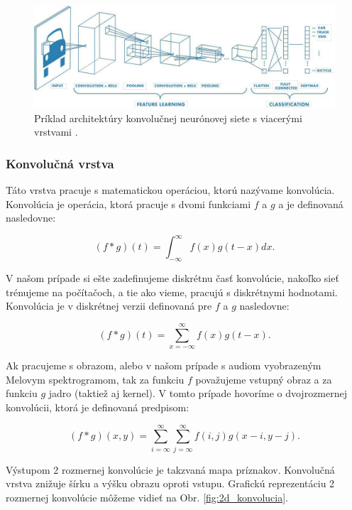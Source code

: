 \begin{figure}[H]
\centerline{\includegraphics[width=1\textwidth]{images/conv multi layer.jpg}}
\caption{Príklad architektúry konvolučnej neurónovej siete s viacerými vrstvami \cite{convnn}.}
\label{fig:conv_multi_layer}
\end{figure}

\subsubsection{Konvolučná vrstva}

Táto vrstva pracuje s matematickou operáciou, ktorú nazývame konvolúcia. Konvolúcia je operácia, ktorá pracuje s dvomi funkciami $f$ a $g$ a je definovaná nasledovne:

\begin{equation}
(f * g)(t) = \int_{-\infty}^{\infty} f(x)g(t - x) dx.
\end{equation}

V našom prípade si ešte zadefinujeme diskrétnu časť konvolúcie, nakoľko sieť trénujeme
na počítačoch, a tie ako vieme, pracujú s diskrétnymi hodnotami. Konvolúcia je v
diskrétnej verzii definovaná pre $f$ a $g$ nasledovne:

\begin{equation}
(f * g)(t) = \sum_{x=-\infty}^{\infty} f(x)g(t - x).
\end{equation}

Ak pracujeme s obrazom, alebo v našom prípade s audiom vyobrazeným Melovym spektrogramom, tak za funkciu $f$ považujeme vstupný obraz a za funkciu $g$ jadro (taktiež aj kernel). V tomto prípade hovoríme o dvojrozmernej konvolúcii, ktorá
je definovaná predpisom:

\begin{equation}
(f * g)(x, y) = \sum_{i=\infty}^{\infty} \sum_{j=\infty}^{\infty} f(i, j)g(x - i, y - j).
\end{equation}

Výstupom 2 rozmernej konvolúcie je takzvaná mapa príznakov. Konvolučná vrstva znižuje šírku a výšku obrazu oproti vstupu. Grafickú reprezentáciu 2 rozmernej konvolúcie môžeme vidieť na Obr. \ref{fig:2d_konvolucia}.

